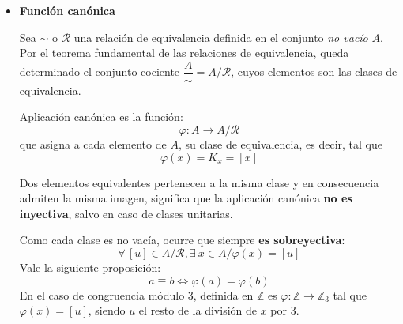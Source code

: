 \begin{itemize}
	\item \textbf{Función canónica} 
	
	Sea $\sim$ o $\mathcal{R}$ una relación de equivalencia definida en el conjunto \textit{no vacío}
	$A$. Por el teorema fundamental de las relaciones de equivalencia, queda determinado
	el conjunto cociente $\dfrac{A}{\sim} = A/ \mathcal{R}$, cuyos elementos son las clases de equivalencia.
	
	\begin{fmd-definition}
		Aplicación canónica es la función:
		\[ \varphi: A \rightarrow A / \mathcal{R} \]
		que asigna a cada elemento de $A$, su clase de equivalencia, es decir, tal que 
		\[ \varphi(x) = K_x = [x] \]
	\end{fmd-definition}
	
	Dos elementos equivalentes pertenecen a la misma clase y en consecuencia admiten la misma imagen, significa que la aplicación canónica \textbf{no es inyectiva}, salvo en caso de clases unitarias.
	
	Como cada clase es no vacía, ocurre que siempre \textbf{es sobreyectiva}:
	\[ \forall \, [u] \in A / \mathcal{R}, \exists \ x \in A / \varphi(x) = [u]  \]
	Vale la siguiente proposición:
	\[ a \equiv b \iff \varphi(a) = \varphi(b)\]
	En el caso de congruencia módulo 3, definida en $\mathbb{Z}$ es
	$\varphi: \mathbb{Z} \rightarrow \mathbb{Z}_3$ tal que $\varphi(x) = [u]$, siendo 
	$u$ el resto de la división de $x$ por 3.
\end{itemize}

